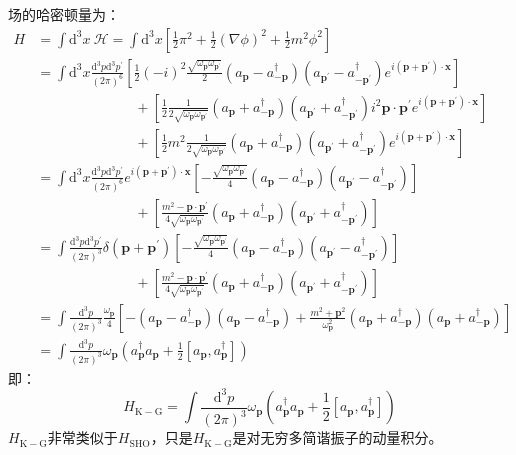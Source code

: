 \documentclass{book}
\begin{document}
场的哈密顿量为：
$$
\begin{aligned}
H&=\int\mathrm{d}^3x\ \mathcal{H}=\int \mathrm{d}^3x\left[\frac{1}{2}\pi^2+\frac{1}{2}(\nabla\phi)^2+\frac{1}{2}m^2\phi^2\right]\\
&=\int \mathrm{d}^3x\frac{\mathrm{d}^3p\mathrm{d}^3p^\prime}{(2\pi)^6}\left[\frac12(-i)^2\frac{\sqrt{\omega_{\mathbf{p}}\omega_{\mathbf{p}^\prime}}}{2}(a_\mathbf{p}-a_{-\mathbf{p}}^\dagger)(a_{\mathbf{p}^\prime}-a_{-\mathbf{p}^\prime}^\dagger) e^{i(\mathbf{p}+\mathbf{p}^\prime)\cdot\mathbf{x}} 
\right]\\&\quad\quad\quad\quad\quad\quad\quad+\left[\frac12\frac{1}{2\sqrt{\omega_{\mathbf{p}}\omega_{\mathbf{p}^\prime}}}(a_\mathbf{p}+a_{-\mathbf{p}}^\dagger)(a_{\mathbf{p}^\prime}+a_{-\mathbf{p}^\prime}^\dagger)i^2\mathbf{p}\cdot\mathbf{p}^\prime e^{i(\mathbf{p}+\mathbf{p}^\prime)\cdot\mathbf{x}}\right] \\
&\quad\quad\quad\quad\quad\quad\quad+\left[\frac12 m^2\frac{1}{2\sqrt{\omega_{\mathbf{p}}\omega_{\mathbf{p}^\prime}}}(a_\mathbf{p}+a_{-\mathbf{p}}^\dagger)(a_{\mathbf{p}^\prime}+a_{-\mathbf{p}^\prime}^\dagger)e^{i(\mathbf{p}+\mathbf{p}^\prime)\cdot\mathbf{x}}\right] \\&=\int \mathrm{d}^3x\frac{\mathrm{d}^3p\mathrm{d}^3p^\prime}{(2\pi)^6}e^{i(\mathbf{p}+\mathbf{p}^\prime)\cdot\mathbf{x}}\left[-\frac{\sqrt{\omega_{\mathbf{p}}\omega_{\mathbf{p}^\prime}}}{4}(a_\mathbf{p}-a_{-\mathbf{p}}^\dagger)(a_{\mathbf{p}^\prime}-a_{-\mathbf{p}^\prime}^\dagger)\right]\\&\quad\quad\quad\quad\quad\quad\quad+\left[\frac{m^2-\mathbf{p}\cdot\mathbf{p}^\prime}{4\sqrt{\omega_{\mathbf{p}}\omega_{\mathbf{p}^\prime}}}(a_\mathbf{p}+a_{-\mathbf{p}}^\dagger)(a_{\mathbf{p}^\prime}+a_{-\mathbf{p}^\prime}^\dagger)\right] \\
&=\int\frac{\mathrm{d}^3p\mathrm{d}^3p^\prime}{(2\pi)^3}\delta(\mathbf{p}+\mathbf{p}^\prime)\left[-\frac{\sqrt{\omega_{\mathbf{p}}\omega_{\mathbf{p}^\prime}}}{4}(a_\mathbf{p}-a_{-\mathbf{p}}^\dagger)(a_{\mathbf{p}^\prime}-a_{-\mathbf{p}^\prime}^\dagger)\right]\\&\quad\quad\quad\quad\quad\quad\quad+\left[\frac{m^2-\mathbf{p}\cdot\mathbf{p}^\prime}{4\sqrt{\omega_{\mathbf{p}}\omega_{\mathbf{p}^\prime}}}(a_\mathbf{p}+a_{-\mathbf{p}}^\dagger)(a_{\mathbf{p}^\prime}+a_{-\mathbf{p}^\prime}^\dagger)\right] 
\\&=\int\frac{\mathrm{d}^3p}{(2\pi)^3}\frac{\omega_{\mathbf{p}}}{4}\left[-(a_\mathbf{p}-a_{-\mathbf{p}}^\dagger)(a_{\mathbf{p}}-a_{-\mathbf{p}}^\dagger)+\frac{m^2+\mathbf{p}^2}{\omega_{\mathbf{p}}^2}(a_\mathbf{p}+a_{-\mathbf{p}}^\dagger)(a_{\mathbf{p}}+a_{-\mathbf{p}}^\dagger)\right]
\\&=\int \frac{\mathrm{d}^3p}{(2\pi)^3}\omega_{\mathbf{p}}\left(a_\mathbf{p}^\dagger a_{\mathbf{p}}+\frac{1}{2}[a_\mathbf{p},a_{\mathbf{p}}^\dagger]\right)
\end{aligned}
$$
即：
$$
H_{\mathrm{K-G}}=\int \frac{\mathrm{d}^3p}{(2\pi)^3}\omega_{\mathbf{p}}\left(a_\mathbf{p}^\dagger a_{\mathbf{p}}+\frac{1}{2}[a_\mathbf{p},a_{\mathbf{p}}^\dagger]\right)
$$
$H_{\mathrm{K-G}}$非常类似于$H_{\mathrm{SHO}}$，只是$H_{\mathrm{K-G}}$是对无穷多简谐振子的动量积分。
\end{document}
